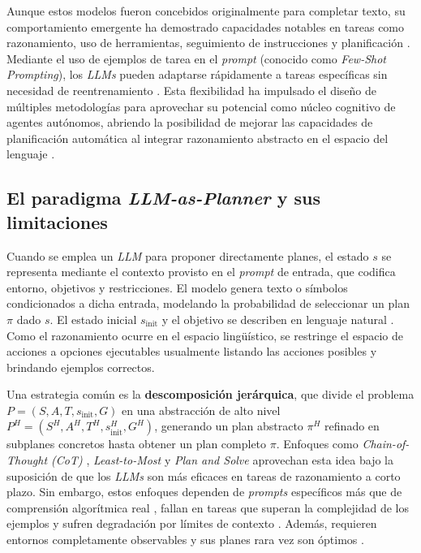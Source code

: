 Aunque estos modelos fueron concebidos originalmente para completar texto, su comportamiento emergente ha demostrado capacidades notables en tareas como razonamiento, uso de herramientas, seguimiento de instrucciones y planificación \parencite{xie2023translating, zhao2024expel}. Mediante el uso de ejemplos de tarea en el \textit{prompt} (conocido como \textit{Few-Shot Prompting}), los \textit{LLMs} pueden adaptarse rápidamente a tareas específicas sin necesidad de reentrenamiento \parencite{devlin2019bert, raffel2020exploring}. Esta flexibilidad ha impulsado el diseño de múltiples metodologías para aprovechar su potencial como núcleo cognitivo de agentes autónomos, abriendo la posibilidad de mejorar las capacidades de planificación automática al integrar razonamiento abstracto en el espacio del lenguaje \parencite{aghzal2025survey}.

\subsection{El paradigma \textit{LLM-as-Planner} y sus limitaciones}

Cuando se emplea un \textit{LLM} para proponer directamente planes, el estado $s$ se representa mediante el contexto provisto en el \textit{prompt} de entrada, que codifica entorno, objetivos y restricciones. El modelo genera texto o símbolos condicionados a dicha entrada, modelando la probabilidad de seleccionar un plan $\pi$ dado $s$. El estado inicial $s_{\text{init}}$ y el objetivo se describen en lenguaje natural \parencite{aghzal2025survey}. Como el razonamiento ocurre en el espacio lingüístico, se restringe el espacio de acciones a opciones ejecutables usualmente listando las acciones posibles y brindando ejemplos correctos.

Una estrategia común es la \textbf{descomposición jerárquica}, que divide el problema $P = (S, A, T, s_{\text{init}}, G)$ en una abstracción de alto nivel $P^H = (S^H, A^H, T^H, s^H_{\text{init}}, G^H)$, generando un plan abstracto $\pi^H$ refinado en subplanes concretos hasta obtener un plan completo $\pi$. Enfoques como \textit{Chain-of-Thought (CoT)} \parencite{wei2022chain, kojima2022large}, \textit{Least-to-Most} \parencite{zhou2022least} y \textit{Plan and Solve} \parencite{wang2023plan} aprovechan esta idea bajo la suposición de que los \textit{LLMs} son más eficaces en tareas de razonamiento a corto plazo. Sin embargo, estos enfoques dependen de \textit{prompts} específicos más que de comprensión algorítmica real \parencite{stechly2024chain}, fallan en tareas que superan la complejidad de los ejemplos y sufren degradación por límites de contexto \parencite{li2024long}. Además, requieren entornos completamente observables y sus planes rara vez son óptimos \parencite{aghzal2025survey}.

